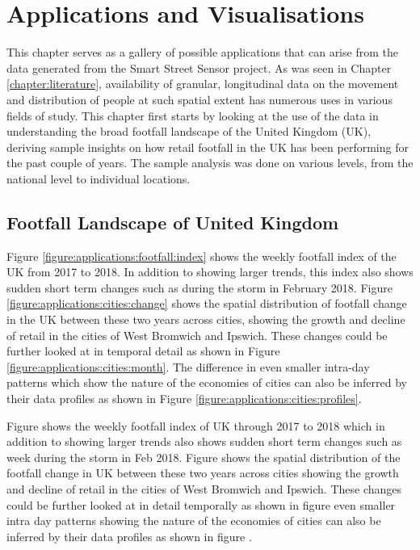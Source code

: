 \chapter{Applications and Visualisations} \label{chapter:application}
This chapter serves as a gallery of possible applications that can arise from the data generated from the Smart Street Sensor project.  As was  seen in Chapter \ref{chapter:literature}, availability of granular, longitudinal data on the movement and distribution of people at such spatial extent has numerous uses in various fields of study. This chapter first starts by looking at the use of the data in understanding the broad footfall landscape of the United Kingdom (UK), deriving sample insights on how retail footfall in the UK has been performing for the past couple of years. The sample analysis was done on various levels, from the national level to individual locations.

\section{Footfall Landscape of United Kingdom}
Figure \ref{figure:applications:footfall:index} shows the weekly footfall index of the UK from 2017 to 2018. In addition to showing larger trends, this index also shows sudden short term changes such as during the storm in February 2018. Figure \ref{figure:applications:cities:change} shows the spatial distribution of footfall change in the UK between these two years across cities, showing the growth and decline of retail in the cities of West Bromwich and Ipswich. These changes could be further looked at in temporal detail as shown in Figure \ref{figure:applications:cities:month}. The difference in even smaller intra-day patterns which show the nature of the economies of cities can also be inferred by their data profiles as shown in Figure \ref{figure:applications:cities:profiles}.

Figure  shows the weekly footfall index of UK through 2017 to 2018 which in addition to showing larger trends also shows sudden short term changes such as week during the storm in Feb 2018. Figure  shows the spatial distribution of the footfall change in UK between these two years across cities showing the growth and decline of retail in the cities of West Bromwich and Ipswich. These changes could be further looked at in detail temporally as shown in figure even smaller intra day patterns showing the nature of the economies of cities can also be inferred by their data profiles as shown in figure .

